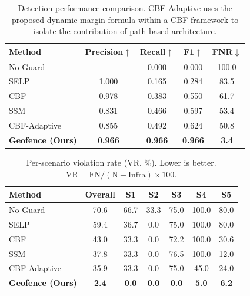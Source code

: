 \begin{table}[t]
\centering
\caption{Detection performance comparison.
  CBF-Adaptive uses the proposed dynamic margin formula within a CBF
  framework to isolate the contribution of path-based architecture.}
\label{tab:detection}
\begin{tabular}{@{}l S[table-format=1.3] S[table-format=1.3]
                    S[table-format=1.3] S[table-format=3.1]@{}}
\toprule
Method & {Precision$\uparrow$} & {Recall$\uparrow$} & {F1$\uparrow$} & {FNR$\downarrow$} \\
\midrule
No Guard          & {--}   & 0.000 & 0.000 & 100.0 \\
SELP              & 1.000  & 0.165 & 0.284 &  83.5 \\
CBF               & 0.978  & 0.383 & 0.550 &  61.7 \\
SSM               & 0.831  & 0.466 & 0.597 &  53.4 \\
CBF-Adaptive      & 0.855  & 0.492 & 0.624 &  50.8 \\
\textbf{Geofence (Ours)} & \textbf{0.966} & \textbf{0.966} & \textbf{0.966} & \textbf{3.4} \\
\bottomrule
\end{tabular}
\end{table}

\begin{table}[t]
\centering
\caption{Per-scenario violation rate (VR, \%). Lower is better.
  $\text{VR} = \text{FN} / (\text{N} - \text{Infra}) \times 100$.}
\label{tab:vr}
\begin{tabular}{@{}l S[table-format=2.1]
                    S[table-format=2.1] S[table-format=2.1]
                    S[table-format=2.1] S[table-format=3.1]
                    S[table-format=2.1]@{}}
\toprule
Method & {Overall} & {S1} & {S2} & {S3} & {S4} & {S5} \\
\midrule
No Guard          & 70.6 & 66.7 & 33.3 & 75.0 & 100.0 & 80.0 \\
SELP              & 59.4 & 36.7 &  0.0 & 75.0 & 100.0 & 80.0 \\
CBF               & 43.0 & 33.3 &  0.0 & 72.2 & 100.0 & 30.6 \\
SSM               & 37.8 & 33.3 &  0.0 & 76.5 & 100.0 & 12.0 \\
CBF-Adaptive      & 35.9 & 33.3 &  0.0 & 75.0 &  45.0 & 24.0 \\
\textbf{Geofence (Ours)} & \textbf{2.4} & \textbf{0.0} & \textbf{0.0} & \textbf{0.0} & \textbf{5.0} & \textbf{6.2} \\
\bottomrule
\end{tabular}
\end{table}

